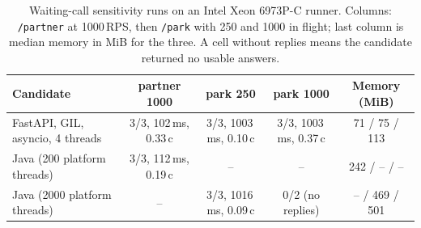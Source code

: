 \begin{table}[t]
\caption{Waiting-call sensitivity runs on an Intel Xeon 6973P-C runner. Columns: \texttt{/partner} at 1000\,RPS, then \texttt{/park} with 250 and 1000 in flight; last column is median memory in MiB for the three. A cell without replies means the candidate returned no usable answers.}
\label{tab:waiting2}
\centering\small
\begin{tabular}{lcccc}
\toprule
Candidate & partner 1000 & park 250 & park 1000 & Memory (MiB) \\
\midrule
FastAPI, GIL, asyncio, 4 threads & 3/3, 102\,ms, 0.33\,c & 3/3, 1003\,ms, 0.10\,c & 3/3, 1003\,ms, 0.37\,c & 71 / 75 / 113 \\
Java (200 platform threads) & 3/3, 112\,ms, 0.19\,c & -- & -- & 242 / -- / -- \\
Java (2000 platform threads) & -- & 3/3, 1016\,ms, 0.09\,c & 0/2 (no replies) & -- / 469 / 501 \\
\bottomrule
\end{tabular}
\end{table}

